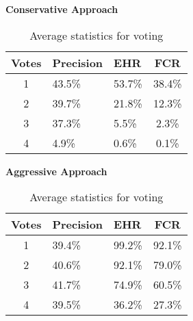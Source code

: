 \begin{table}[h]
  \centering
  \textbf{Conservative Approach}\vspace{2pt}
  \begin{tabularx}{\columnwidth}{cXXc}
    \toprule
    \textbf{Votes} & \textbf{Precision} & \textbf{EHR} & \textbf{FCR} \\
    \midrule
    1 & 43.5\% & 53.7\% & 38.4\% \\ \hline
    2 & 39.7\% & 21.8\% & 12.3\% \\ \hline
    3 & 37.3\% & 5.5\% & 2.3\% \\ \hline
    4 & 4.9\% & 0.6\% & 0.1\% \\ \hline
    \bottomrule
  \end{tabularx}

  \vspace{4pt}

  \textbf{Aggressive Approach}\vspace{2pt}
  \begin{tabularx}{\columnwidth}{cXXc}
    \toprule
    \textbf{Votes} & \textbf{Precision} & \textbf{EHR} & \textbf{FCR} \\
    \midrule
    1 & 39.4\% & 99.2\% & 92.1\% \\ \hline
    2 & 40.6\% & 92.1\% & 79.0\% \\ \hline
    3 & 41.7\% & 74.9\% & 60.5\% \\ \hline
    4 & 39.5\% & 36.2\% & 27.3\% \\ \hline
    \bottomrule
  \end{tabularx}

  \caption{Average statistics for voting}
  \label{[TABLE] avg_stats_voting}
\end{table}